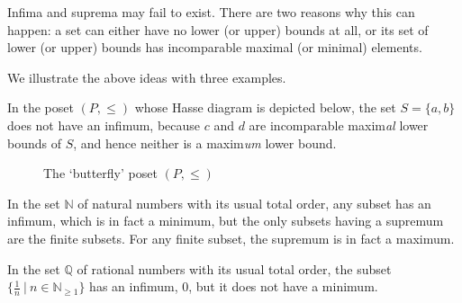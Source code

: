 Infima and suprema may fail to exist. There are two reasons why this can happen: a set can either have no lower (or upper) bounds at all, or its set of lower (or upper) bounds has incomparable maximal (or minimal) elements.

We illustrate the above ideas with three examples.
\begin{example}\label{exa:butterfly}
In the poset $(P,\leq)$ whose Hasse diagram is depicted below, the set $S = \{a,b\}$ does not have an infimum, because $c$ and $d$ are incomparable maxim\emph{al} lower bounds of $S$, and hence neither is a maxim\emph{um} lower bound.


\begin{figure}[htp]
\begin{center}
\end{center}
\vspace{-5mm}
\caption{The `butterfly' poset $(P,\leq)$}
\label{fig:butterfly}
\end{figure}
\end{example}

\begin{example}\label{exa:naturalsinfsup}
In the set $\mathbb{N}$ of natural numbers with its usual total order, any subset has an infimum, which is in fact a minimum, but the only subsets having a supremum are the finite subsets. For any finite subset, the supremum is in fact a maximum.
\end{example}

\begin{example}\label{exa:rationalsinf}
In the set $\mathbb{Q}$ of rational numbers with its usual total order, the subset $\{\frac{1}{n} \ | \ n \in \mathbb{N}_{\geq 1}\}$ has an infimum, $0$, but it does not have a minimum.
\end{example}

